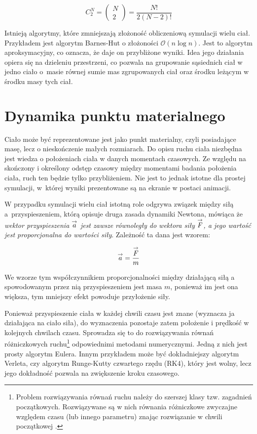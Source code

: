 \documentclass[12pt, twoside, openany]{report}
\begin{document}
\begin{equation}
\label{eq:liczba_par}
C_2^N = \left(\begin{array}{c}N\\ 2\end{array}\right) = \frac {N!}{2(N-2)!}
\end{equation}

Istnieją algorytmy, które zmniejszają złożoność obliczeniową symulacji wielu ciał. Przykładem jest algorytm Barnes-Hut o złożoności $\mathcal{O}(n\log{}n)$. Jest to algorytm aproksymacyjny, co oznacza, że daje on przybliżone wyniki. Idea jego działania opiera się na dzieleniu przestrzeni, co pozwala na grupowanie sąsiednich ciał w jedno ciało o~masie równej sumie mas zgrupowanych ciał oraz środku leżącym w środku masy tych ciał.

\section{Dynamika punktu materialnego}

Ciało może być reprezentowane jest jako punkt materialny, czyli posiadające masę, lecz o nieskończenie małych rozmiarach. Do opisu ruchu ciała niezbędna jest wiedza o położeniach ciała w danych momentach czasowych. Ze względu na skończony i określony odstęp czasowy między momentami badania położenia ciała, ruch ten będzie tylko przybliżeniem. Nie jest to jednak istotne dla prostej symulacji, w~której wyniki prezentowane są na ekranie w postaci animacji.

W przypadku symulacji wielu ciał istotną role odgrywa związek między siłą a~przyspieszeniem, którą opisuje druga zasada dynamiki Newtona, mówiąca że \textit{wektor przyspieszenia $\overset{\text{\scriptsize$\rightarrow$}}{a}$ jest zawsze równoległy do wektora siły $\overset{\text{\scriptsize$\rightarrow$}}{F}$, a jego wartość jest proporcjonalna do wartości siły}. Zależność ta dana jest wzorem:

\begin{equation}
\label{eq:przyspieszenie}
\overset{\text{\scriptsize$\rightarrow$}}{a} = \frac{\overset{\text{\scriptsize$\rightarrow$}}{F}}{m}
\end{equation}


We wzorze tym współczynnikiem proporcjonalności między działającą siłą a spowodowanym przez nią przyspieszeniem jest masa $m$, ponieważ im jest ona większa, tym mniejszy efekt powoduje przyłożenie siły.

Ponieważ przyspieszenie ciała w każdej chwili czasu jest znane (wyznacza ja działająca na ciało siła), do wyznaczenia pozostaje zatem położenie i prędkość w kolejnych chwilach czasu. Sprowadza się to do rozwiązywania równań różniczkowych ruchu\footnote{Problem rozwiązywania równań ruchu należy do szerszej klasy tzw. zagadnień początkowych. Rozwiązywane są w nich równania różniczkowe zwyczajne względem czasu (lub innego parametru) znając rozwiązanie w chwili początkowej \cite{bib:dziubak}.}
odpowiednimi metodami numerycznymi. Jedną z nich jest prosty algorytm Eulera. Innym przykładem może być dokładniejszy algorytm Verleta, czy algorytm Runge-Kutty czwartego rzędu (RK4), który jest wolny, lecz jego dokładność pozwala na zwiększenie kroku czasowego.
\end{document}
